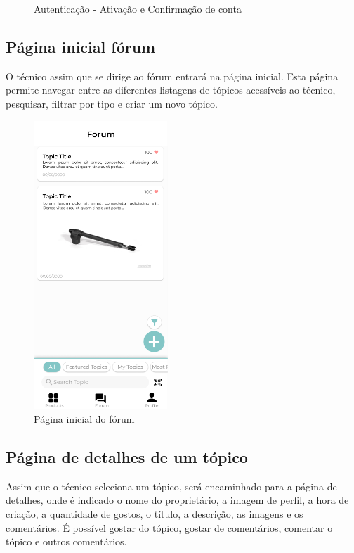 \begin{figure}[htb]
  \caption{Autenticação - Ativação e Confirmação de conta}%
  \label{fig:25}%
\end{figure}

\newpage

\subsection{Página inicial fórum}

O técnico assim que se dirige ao fórum entrará na página inicial. Esta página permite navegar entre as diferentes listagens de tópicos acessíveis ao técnico, pesquisar, filtrar por tipo e criar um novo tópico.

\begin{figure}[htb]
  \centering
  \includegraphics[width=0.45\textwidth]{images/mockups/forum_home.png}
  \caption{Página inicial do fórum}
  \label{fig:26}
\end{figure}

\newpage

\subsection{Página de detalhes de um tópico}

Assim que o técnico seleciona um tópico, será encaminhado para a página de detalhes, onde é indicado o nome do proprietário, a imagem de perfil, a hora de criação, a quantidade de gostos, o título, a descrição, as imagens e os comentários. É possível gostar do tópico, gostar de comentários, comentar o tópico e outros comentários.

